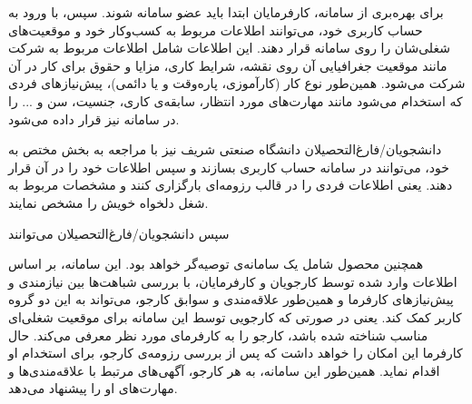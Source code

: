 برای بهره‌بری از سامانه، کارفرمایان ابتدا باید عضو سامانه شوند. سپس، با ورود به حساب کاربری خود، می‌توانند اطلاعات مربوط به کسب‌و‌کار خود و موقعیت‌های شغلی‌شان را روی سامانه قرار دهند. این اطلاعات شامل اطلاعات مربوط به شرکت مانند موقعیت جغرافیایی آن روی نقشه، شرایط کاری، مزایا و حقوق برای کار در آن شرکت می‌شود. همین‌طور نوع کار (کارآموزی، پاره‌وقت و یا دائمی)، پیش‌نیازهای فردی که استخدام می‌شود مانند مهارت‌های مورد انتظار، سابقه‌ی کاری، جنسیت، سن و ... را در سامانه نیز قرار داده‌ می‌شود.

دانشجویان/فارغ‌التحصیلان دانشگاه صنعتی شریف نیز با مراجعه به بخش مختص به خود، می‌توانند در سامانه حساب کاربری بسازند و سپس اطلاعات خود را در آن قرار دهند. یعنی اطلاعات فردی را در قالب رزومه‌ای بارگزاری کنند و مشخصات مربوط به شغل دلخواه خویش را مشخص نمایند. 

سپس دانشجویان/فارغ‌التحصیلان می‌توانند 

همچنین محصول شامل یک سامانه‌ی توصیه‌گر
خواهد بود.
این سامانه، بر اساس اطلاعات وارد شده توسط کارجویان و کارفرمایان، با بررسی شباهت‌ها بین نیازمندی و پیش‌نیازهای کارفرما و همین‌طور علاقه‌مندی و سوابق کارجو، می‌تواند به این دو گروه کاربر کمک کند. یعنی در صورتی که کارجویی توسط این سامانه برای موقعیت شغلی‌ای مناسب شناخته شده باشد، کارجو را به کارفرمای مورد نظر معرفی می‌کند. حال کارفرما این امکان را خواهد داشت که پس از بررسی رزومه‌ی کارجو، برای استخدام او اقدام نماید. همین‌طور این سامانه، به هر کارجو، آگهی‌های مرتبط با علاقه‌مندی‌ها و مهارت‌های او را پیشنهاد می‌دهد.  




